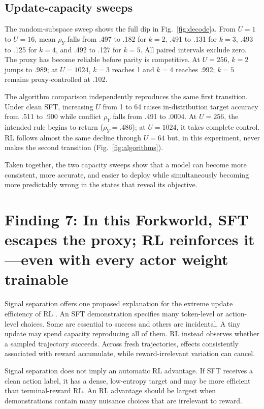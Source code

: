 \documentclass[11pt,a4paper]{article}
\newcommand{\rhoY}{\rho_Y}
\newcommand{\fig}[1]{Fig.~\ref{#1}}
\begin{document}
\subsection*{Update-capacity sweeps}

The random-subspace sweep shows the full dip in \fig{fig:decode}a. From $U=1$ to $U=16$, mean $\rhoY$ falls from .497 to .182 for $k=2$, .491 to .131 for $k=3$, .493 to .125 for $k=4$, and .492 to .127 for $k=5$. All paired intervals exclude zero. The proxy has become reliable before parity is competitive. At $U=256$, $k=2$ jumps to .989; at $U=1024$, $k=3$ reaches 1 and $k=4$ reaches .992; $k=5$ remains proxy-controlled at .102.

The algorithm comparison independently reproduces the same first transition. Under clean SFT, increasing $U$ from 1 to 64 raises in-distribution target accuracy from .511 to .900 while conflict $\rhoY$ falls from .491 to .0004. At $U=256$, the intended rule begins to return ($\rhoY=.486$); at $U=1024$, it takes complete control. RL follows almost the same decline through $U=64$ but, in this experiment, never makes the second transition (\fig{fig:algorithms}).

Taken together, the two capacity sweeps show that a model can become more consistent, more accurate, and easier to deploy while simultaneously becoming more predictably wrong in the states that reveal its objective.

\section*{Finding 7: In this Forkworld, SFT escapes the proxy; RL reinforces it---even with every actor weight trainable}

Signal separation offers one proposed explanation for the extreme update efficiency of RL \citep{morris2026reason}. An SFT demonstration specifies many token-level or action-level choices. Some are essential to success and others are incidental. A tiny update may spend capacity reproducing all of them. RL instead observes whether a sampled trajectory succeeds. Across fresh trajectories, effects consistently associated with reward accumulate, while reward-irrelevant variation can cancel.

Signal separation does not imply an automatic RL advantage. If SFT receives a clean action label, it has a dense, low-entropy target and may be more efficient than terminal-reward RL. An RL advantage should be largest when demonstrations contain many nuisance choices that are irrelevant to reward.
\end{document}

